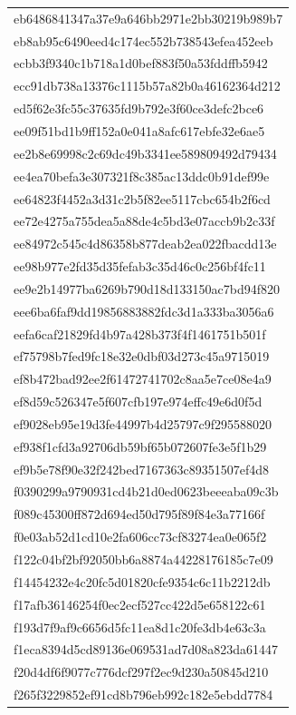 \begin{tabular}{l}
eb6486841347a37e9a646bb2971e2bb30219b989b7 \\
eb8ab95c6490eed4c174ec552b738543efea452eeb \\
ecbb3f9340c1b718a1d0bef883f50a53fddffb5942 \\
ecc91db738a13376c1115b57a82b0a46162364d212 \\
ed5f62e3fc55c37635fd9b792e3f60ce3defc2bce6 \\
ee09f51bd1b9ff152a0e041a8afc617ebfe32e6ae5 \\
ee2b8e69998c2c69dc49b3341ee589809492d79434 \\
ee4ea70befa3e307321f8c385ac13ddc0b91def99e \\
ee64823f4452a3d31c2b5f82ee5117cbc654b2f6cd \\
ee72e4275a755dea5a88de4c5bd3e07accb9b2c33f \\
ee84972c545c4d86358b877deab2ea022fbacdd13e \\
ee98b977e2fd35d35fefab3c35d46c0c256bf4fc11 \\
ee9e2b14977ba6269b790d18d133150ac7bd94f820 \\
eee6ba6faf9dd19856883882fdc3d1a333ba3056a6 \\
eefa6caf21829fd4b97a428b373f4f1461751b501f \\
ef75798b7fed9fc18e32e0dbf03d273c45a9715019 \\
ef8b472bad92ee2f61472741702c8aa5e7ce08e4a9 \\
ef8d59c526347e5f607cfb197e974effc49e6d0f5d \\
ef9028eb95e19d3fe44997b4d25797c9f295588020 \\
ef938f1cfd3a92706db59bf65b072607fe3e5f1b29 \\
ef9b5e78f90e32f242bed7167363c89351507ef4d8 \\
f0390299a9790931cd4b21d0ed0623beeeaba09c3b \\
f089c45300ff872d694ed50d795f89f84e3a77166f \\
f0e03ab52d1cd10e2fa606cc73cf83274ea0e065f2 \\
f122c04bf2bf92050bb6a8874a44228176185c7e09 \\
f14454232e4c20fc5d01820cfe9354c6c11b2212db \\
f17afb36146254f0ec2ecf527cc422d5e658122c61 \\
f193d7f9af9c6656d5fc11ea8d1c20fe3db4e63c3a \\
f1eca8394d5cd89136e069531ad7d08a823da61447 \\
f20d4df6f9077c776dcf297f2ec9d230a50845d210 \\
f265f3229852ef91cd8b796eb992c182e5ebdd7784 \\

\end{tabular}
